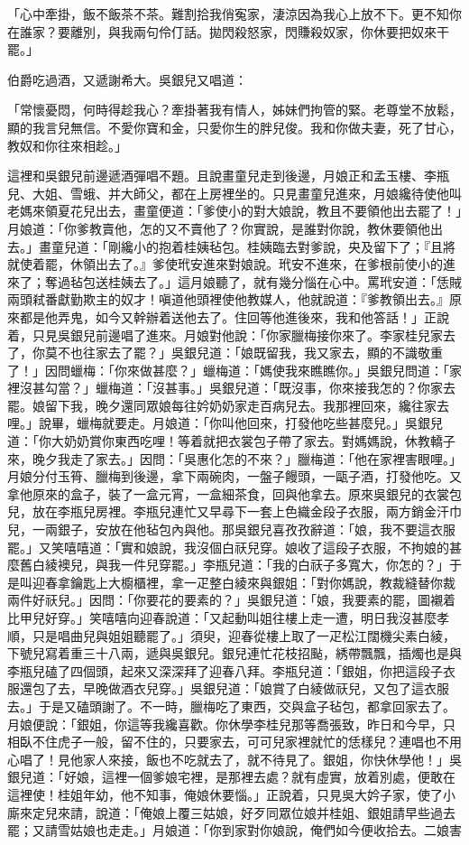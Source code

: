 「心中牽掛，飯不飯茶不茶。難割拾我俏寃家，淒涼因為我心上放不下。更不知你在誰家？要離別，與我兩句伶仃話。拋閃殺怒家，閃賺殺奴家，你休要把奴來干罷。」

伯爵吃過酒，又遞謝希大。吳銀兒又唱道：

「常懷憂悶，何時得趁我心？牽掛著我有情人，姊妹們拘管的緊。老尊堂不放鬆，顯的我言兒無信。不愛你寶和金，只愛你生的胖兒俊。我和你做夫妻，死了甘心，教奴和你往來相趁。」

這裡和吳銀兒前邊遞酒彈唱不題。且說畫童兒走到後邊，月娘正和孟玉樓、李瓶兒、大姐、雪蛾、并大師父，都在上房裡坐的。只見畫童兒進來，月娘纔待使他叫老媽來領夏花兒出去，畫童便道：「爹使小的對大娘說，教且不要領他出去罷了！」月娘道：「你爹教賣他，怎的又不賣他了？你實說，是誰對你說，教休要領他出去。」畫童兒道：「剛纔小的抱着桂姨毡包。桂姨臨去對爹說，央及留下了；『且將就使着罷，休領出去了。』爹使玳安進來對娘說。玳安不進來，在爹根前使小的進來了；奪過毡包送桂姨去了。」這月娘聽了，就有幾分惱在心中。罵玳安道：「恁賊兩頭弒番獻勤欺主的奴才！嗔道他頭裡使他教媒人，他就說道：『爹教領出去。』原來都是他弄鬼，如今又幹辦着送他去了。住回等他進後來，我和他答話！」正說着，只見吳銀兒前邊唱了進來。月娘對他說：「你家臘梅接你來了。李家桂兒家去了，你莫不也往家去了罷？」吳銀兒道：「娘既留我，我又家去，顯的不識敬重了！」因問蠟梅：「你來做甚麼？」蠟梅道：「媽使我來瞧瞧你。」吳銀兒問道：「家裡沒甚勾當？」蠟梅道：「沒甚事。」吳銀兒道：「既沒事，你來接我怎的？你家去罷。娘留下我，晚夕還同眾娘每往妗奶奶家走百病兒去。我那裡回來，纔往家去哩。」說畢，蠟梅就要走。月娘道：「你叫他回來，打發他吃些甚麼兒。」吳銀兒道：「你大奶奶賞你東西吃哩！等着就把衣裳包子帶了家去。對媽媽說，休教轎子來，晚夕我走了家去。」因問：「吳惠化怎的不來？」臘梅道：「他在家裡害眼哩。」月娘分付玉筲、臘梅到後邊，拿下兩碗肉，一盤子饅頭，一甌子酒，打發他吃。又拿他原來的盒子，裝了一盒元宵，一盒細茶食，回與他拿去。原來吳銀兒的衣裳包兒，放在李瓶兒房裡。李瓶兒連忙又早尋下一套上色織金段子衣服，兩方銷金汗巾兒，一兩銀子，安放在他毡包內與他。那吳銀兒喜孜孜辭道：「娘，我不要這衣服罷。」又笑嘻嘻道：「實和娘說，我沒個白祆兒穿。娘收了這段子衣服，不拘娘的甚麼舊白綾襖兒，與我一件兒穿罷。」李瓶兒道：「我的白祆子多寬大，你怎的？」于是叫迎春拿鑰匙上大櫥櫃裡，拿一疋整白綾來與銀姐：「對你媽說，教裁縫替你裁兩件好祆兒。」因問：「你要花的要素的？」吳銀兒道：「娘，我要素的罷，圖襯着比甲兒好穿。」笑嘻嘻向迎春說道：「又起動叫姐往樓上走一遭，明日我沒甚麼孝順，只是唱曲兒與姐姐聽罷了。」須臾，迎春從樓上取了一疋松江闊機尖素白綾，下號兒寫着重三十八兩，遞與吳銀兒。銀兒連忙花枝招颭，綉帶飄飄，插燭也是與李瓶兒磕了四個頭，起來又深深拜了迎春八拜。李瓶兒道：「銀姐，你把這段子衣服還包了去，早晚做酒衣兒穿。」吳銀兒道：「娘賞了白綾做祆兒，又包了這衣服去。」于是又磕頭謝了。不一時，臘梅吃了東西，交與盒子毡包，都拿回家去了。月娘便說：「銀姐，你這等我纔喜歡。你休學李桂兒那等喬張致，昨日和今早，只相臥不住虎子一般，留不住的，只要家去，可可兒家裡就忙的恁樣兒？連唱也不用心唱了！見他家人來接，飯也不吃就去了，就不待見了。銀姐，你快休學他！」吳銀兒道：「好娘，這裡一個爹娘宅裡，是那裡去處？就有虛實，放着別處，便敢在這裡使！桂姐年幼，他不知事，俺娘休要惱。」正說着，只見吳大妗子家，使了小廝來定兒來請，說道：「俺娘上覆三姑娘，好歹同眾位娘并桂姐、銀姐請早些過去罷；又請雪姑娘也走走。」月娘道：「你到家對你娘說，俺們如今便收拾去。二娘害